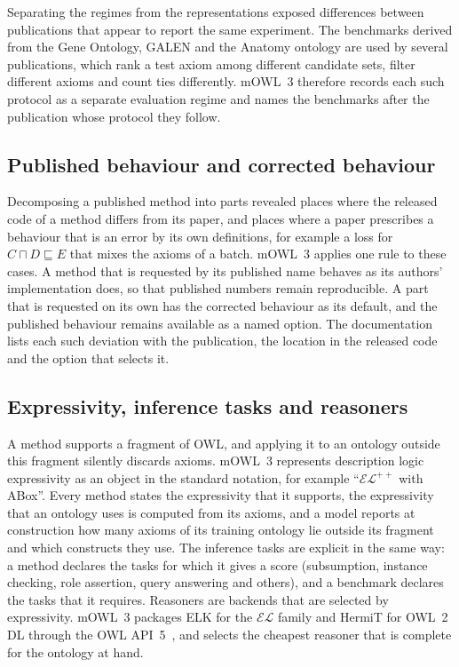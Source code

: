 \documentclass[runningheads]{llncs}
\newcommand{\EL}{\ensuremath{\mathcal{EL}}}
\newcommand{\ELpp}{\ensuremath{\mathcal{EL}^{++}}}
\begin{document}
Separating the regimes from the representations exposed differences between
publications that appear to report the same experiment. The benchmarks derived from the
Gene Ontology, GALEN and the Anatomy ontology are used by several publications, which
rank a test axiom among different candidate sets, filter different axioms and count ties
differently. mOWL~3 therefore records each such protocol as a separate evaluation regime
and names the benchmarks after the publication whose protocol they follow.

\subsection{Published behaviour and corrected behaviour}

Decomposing a published method into parts revealed places where the released code of a
method differs from its paper, and places where a paper prescribes a behaviour that is
an error by its own definitions, for example a loss for $C \sqcap D \sqsubseteq E$ that
mixes the axioms of a batch. mOWL~3 applies one rule to these cases. A method that is
requested by its published name behaves as its authors' implementation does, so that
published numbers remain reproducible. A part that is requested on its own has the
corrected behaviour as its default, and the published behaviour remains available as a
named option. The documentation lists each such deviation with the publication, the
location in the released code and the option that selects it.

\subsection{Expressivity, inference tasks and reasoners}

A method supports a fragment of OWL, and applying it to an ontology outside this
fragment silently discards axioms. mOWL~3 represents description logic expressivity as an
object in the standard notation, for example ``\ELpp{} with ABox''. Every method
states the expressivity that it supports, the expressivity that an ontology uses is
computed from its axioms, and a model reports at construction how many axioms of its
training ontology lie outside its fragment and which constructs they use. The inference
tasks are explicit in the same way: a method declares the tasks for which it gives a
score (subsumption, instance checking, role assertion, query answering and others), and
a benchmark declares the tasks that it requires. Reasoners are backends that are
selected by expressivity. mOWL~3 packages ELK for the \EL{} family and HermiT for OWL~2
DL through the OWL API~5~\cite{horridge2011}, and selects the cheapest reasoner that is
complete for the ontology at hand.
\end{document}
